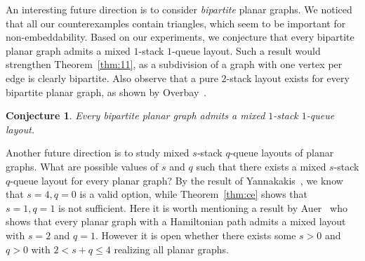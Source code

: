 \documentclass[orivec]{llncs}
\newtheorem{conj}{Conjecture}
\begin{document}
An interesting future direction is to consider {\it bipartite} planar graphs. We noticed that
all our counterexamples contain triangles, which seem to be important for non-embeddability.
Based on our experiments, we conjecture that every bipartite planar graph admits a mixed $1$-stack $1$-queue layout.
Such a result would strengthen Theorem~\ref{thm:11}, as a subdivision of a graph with one 
vertex per edge is clearly bipartite. Also observe that a pure $2$-stack layout exists for every 
bipartite planar graph, as shown by Overbay~\cite{Over98}.

\begin{conj}
    Every bipartite planar graph admits a mixed $1$-stack $1$-queue layout.
\end{conj}

Another future direction is to study mixed $s$-stack $q$-queue layouts of planar graphs. What 
are possible values of $s$ and $q$ such that there exists a mixed $s$-stack $q$-queue layout for every
planar graph? By the result of Yannakakis~\cite{Yan89}, we know that $s=4, q=0$ is a valid option, while
Theorem~\ref{thm:ce} shows that $s=1, q=1$ is not sufficient. Here it is worth mentioning a result
by Auer~\cite{Auer14} who shows that every planar graph with a Hamiltonian path admits a mixed layout 
with $s=2$ and $q=1$. However it is open whether there exists some $s > 0$ and $q > 0$ with $2 < s + q \le 4$ realizing
all planar graphs.





    
\end{document}
